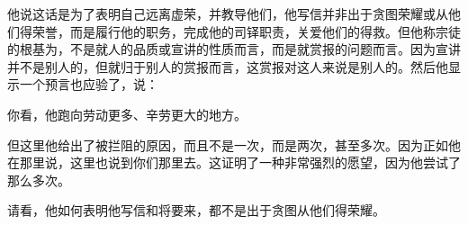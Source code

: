 他说这话是为了表明自己远离虚荣，并教导他们，他写信并非出于贪图荣耀或从他们得荣誉，而是履行他的职务，完成他的司铎职责，关爱他们的得救。但他称宗徒的根基为，不是就人的品质或宣讲的性质而言，而是就赏报的问题而言。因为宣讲并不是别人的，但就归于别人的赏报而言，这赏报对这人来说是别人的。然后他显示一个预言也应验了，说：\par

  \par

你看，他跑向劳动更多、辛劳更大的地方。\par

 \par

  但这里他给出了被拦阻的原因，而且不是一次，而是两次，甚至多次。因为正如他在那里说，这里也说到你们那里去。这证明了一种非常强烈的愿望，因为他尝试了那么多次。\par

 \par

请看，他如何表明他写信和将要来，都不是出于贪图从他们得荣耀。\par

 \par

